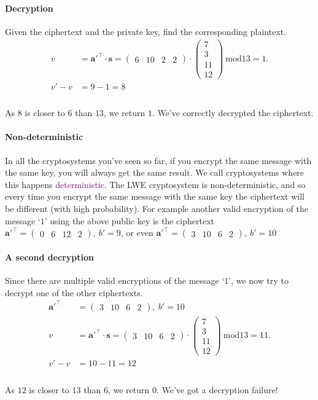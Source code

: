 \documentclass[a4paper, 11pt, openany]{book}
\numberwithin{equation}{section}
\theoremstyle{plain}
\theoremstyle{definition}
\newcommand{\Define}[1]{\textcolor{purple}{#1}}
\begin{document}
\paragraph{Decryption}
Given the ciphertext and the private key, find the corresponding plaintext.
\\
\begin{align*}
v &= \textbf{a}'^{\top}\cdot\textbf{s} = \begin{pmatrix}
	6&10&2&2
\end{pmatrix} \cdot \begin{pmatrix} 7 \\ 3 \\ 11 \\ 12 \end{pmatrix}~\text{mod} 13 =  1. \\
v' - v &= 9 - 1 = 8\\
\end{align*}
\\
As $8$ is closer to $6$ than $13$, we return $1$. We've correctly decrypted the ciphertext.
\\
\paragraph{Non-deterministic} In all the cryptosystems you've seen so far, if you encrypt the same message with the same key, you will always get the same result. We call cryptosystems where this happens \Define{deterministic}. The LWE cryptosystem is non-deterministic, and so every time you encrypt the same message with the same key the ciphertext will be different (with high probability). For example another valid encryption of the message `$1$' using the above public key is the ciphertext $\textbf{a}'^{\top} = \begin{pmatrix}
	0&6&12&2
\end{pmatrix},~ b' = 9$, or even $\textbf{a}'^{\top} = \begin{pmatrix}
3&10&6&2
\end{pmatrix},~ b' = 10$
\paragraph{A second decryption} Since there are multiple valid encryptions of the message `$1$', we now try to decrypt one of the other ciphertexts.
\begin{align*}
\textbf{a}'^{\top}& = \begin{pmatrix}
	3&10&6&2
\end{pmatrix},~ b' = 10
\\
v &= \textbf{a}'^{\top}\cdot\textbf{s} = \begin{pmatrix}
	3&10&6&2
\end{pmatrix} \cdot \begin{pmatrix} 7 \\ 3 \\ 11 \\ 12 \end{pmatrix}~\text{mod} 13 =  11.
\\
v' - v &= 10 - 11 = 12\\
\end{align*}
\\
As $12$ is closer to $13$ than $6$, we return $0$. We've got a decryption failure!
\end{document}
